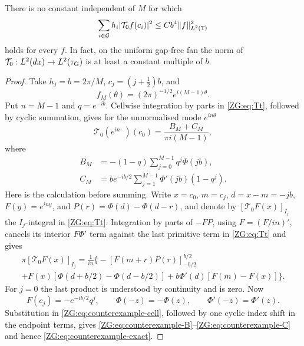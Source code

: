 \begin{proposition}
\label{ZG:prop:Peano-counterexample}
There is no constant independent of $M$ for which
\begin{equation}\label{ZG:eq:false-Peano-square}
 \sum_{i\in\mathcal G}h_i|\mathcal T_0f(c_i)|^2
 \le C b^4\|f\|_{L^2(\mathbb T)}^2
\end{equation}
holds for every $f$.  In fact, on the uniform gap-free fan the norm of
$\mathcal T_0:L^2(dx)\to L^2(\tau_{\rm G})$ is at least a constant
multiple of $b$.
\end{proposition}

\begin{proof}
Take $h_j=b=2\pi/M$, $c_j=(j+\tfrac12)b$, and
\[
 f_M(\theta)=(2\pi)^{-1/2}e^{i(M-1)\theta}.
\]
Put $n=M-1$ and $q=e^{-ib}$.  Cellwise integration by parts in
\eqref{ZG:eq:Tt}, followed by cyclic summation, gives for the unnormalised
mode $e^{in\theta}$
\begin{equation}\label{ZG:eq:counterexample-exact}
 \mathcal T_0(e^{in\cdot})(c_0)
 =\frac{B_M+C_M}{\pi i(M-1)},
\end{equation}
where
\begin{align}
 B_M&=-(1-q)\sum_{j=0}^{M-1}q^j\Phi(jb),
 \label{ZG:eq:counterexample-B}\\
 C_M&=b e^{-ib/2}\sum_{j=1}^{M-1}
       \Phi'(jb)(1-q^j).
 \label{ZG:eq:counterexample-C}
\end{align}
Here is the calculation before summing.  Write $x=c_0$, $m=c_j$,
$d=x-m=-jb$, $F(y)=e^{iny}$, and
$P(r)=\Phi(d)-\Phi(d-r)$, and denote by
$[\mathcal T_0F(x)]_{I_j}$ the $I_j$-integral in \eqref{ZG:eq:Tt}.
Integration by parts of $-FP$, using
$F=(F/in)'$, cancels its interior $F\Phi'$ term against the last
primitive term in \eqref{ZG:eq:Tt} and gives
\begin{multline}\label{ZG:eq:counterexample-cell}
 \pi[\mathcal T_0F(x)]_{I_j}
 =\frac1{in}\Big\{
 -[F(m+r)P(r)]_{-b/2}^{b/2}\\
 +F(x)[\Phi(d+b/2)-\Phi(d-b/2)]
 +b\Phi'(d)[F(m)-F(x)]\Big\}.
\end{multline}
For $j=0$ the last product is understood by continuity and is zero.
Now
\[
 F(c_j)=-e^{-ib/2}q^j,
 \qquad \Phi(-z)=-\Phi(z),
 \qquad \Phi'(-z)=\Phi'(z).
\]
Substitution in \eqref{ZG:eq:counterexample-cell}, followed by one cyclic
index shift in the endpoint terms, gives
\eqref{ZG:eq:counterexample-B}--\eqref{ZG:eq:counterexample-C} and hence
\eqref{ZG:eq:counterexample-exact}.


\end{proof}
